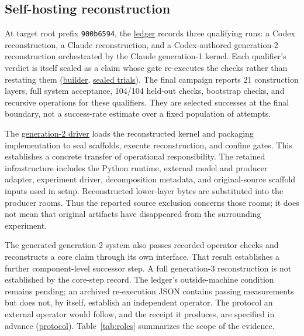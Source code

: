 \documentclass[10pt,twocolumn,letterpaper]{article}
\newcommand{\artifact}[2]{\href{https://github.com/rz4/reticuli/blob/5318acaac34ef99eeba9ff064a995a6313cc70ec/#1}{#2}}
\begin{document}
\subsection{Self-hosting reconstruction}
At target root prefix \texttt{900b6594}, the \artifact{research/metrics/closure-ledger.md}{ledger} records three qualifying runs: a Codex reconstruction, a Claude reconstruction, and a Codex-authored generation-2 reconstruction orchestrated by the Claude generation-1 kernel. Each qualifier's verdict is itself sealed as a claim whose gate re-executes the checks rather than restating them (\artifact{research/harness/closure/trial_claim.py}{builder}, \artifact{research/harness/closure/trialclaims}{sealed trials}). The final campaign reports 21 construction layers, full system acceptance, 104/104 held-out checks, bootstrap checks, and recursive operations for these qualifiers. They are selected successes at the final boundary, not a success-rate estimate over a fixed population of attempts.

The \artifact{research/harness/succession/run_grandchild.py}{generation-2 driver} loads the reconstructed kernel and packaging implementation to seal scaffolds, execute reconstruction, and confine gates. This establishes a concrete transfer of operational responsibility. The retained infrastructure includes the Python runtime, external model and producer adapter, experiment driver, decomposition metadata, and original-source scaffold inputs used in setup. Reconstructed lower-layer bytes are substituted into the producer rooms. Thus the reported source exclusion concerns those rooms; it does not mean that original artifacts have disappeared from the surrounding experiment.

The generated generation-2 system also passes recorded operator checks and reconstructs a core claim through its own interface. That result establishes a further component-level successor step. A full generation-3 reconstruction is not established by the core-step record. The ledger's outside-machine condition remains pending; an archived re-execution JSON contains passing measurements but does not, by itself, establish an independent operator. The protocol an external operator would follow, and the receipt it produces, are specified in advance (\artifact{research/harness/closure/outside.md}{protocol}). Table~\ref{tab:roles} summarizes the scope of the evidence.
\end{document}
